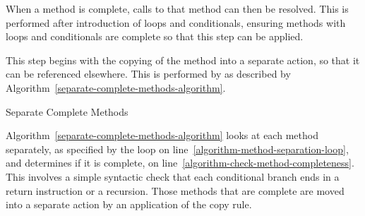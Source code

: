 When a method is complete, calls to that method can then be resolved.
This is performed after introduction of loops and conditionals,
ensuring methods with loops and conditionals are complete so that this
step can be applied.

This step begins with the copying of the method into a separate
action, so that it can be referenced elsewhere.
This is performed by as described by
Algorithm~\ref{separate-complete-methods-algorithm}.
\begin{algorithm}
  \begin{algorithmic}[1]
     \label{algorithm-method-separation-loop}
     \label{algorithm-check-method-completeness}
    \State {}
    \EndIf
    \EndFor
    \EndProcedure
  \end{algorithmic}
  \caption{Separate Complete Methods}
  \label{separate-complete-methods-algorithm}
\end{algorithm}

Algorithm~\ref{separate-complete-methods-algorithm} looks at each
method separately, as specified by the loop on
line~\ref{algorithm-method-separation-loop}, and determines if it is
complete, on line~\ref{algorithm-check-method-completeness}.
This involves a simple syntactic check that each conditional branch
ends in a return instruction or a recursion.
Those methods that are complete are moved into a separate action by an
application of the copy rule.

